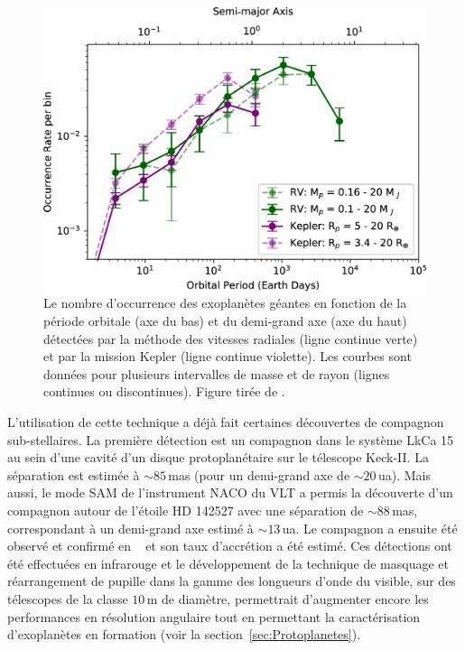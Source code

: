 \begin{figure}[ht!]
    \centering
    \includegraphics[width=\figwidth]{Figure_Chap1/Fernandes2019_Figure02.jpg}
    \caption[Le nombre d'occurrence des exoplanètes détectées par la méthode des vitesses radiales et par la mission Kepler en fonction de la période orbitale et du demi-grand axe.]{Le nombre d'occurrence des exoplanètes géantes en fonction de la période orbitale (axe du bas) et du demi-grand axe (axe du haut) détectées par la méthode des vitesses radiales (ligne continue verte) et par la mission Kepler (ligne continue violette). Les courbes sont données pour plusieurs intervalles de masse et de rayon (lignes continues ou discontinues). Figure tirée de \cite{fernandes2019}.}
    \label{fig:Fernandes2019F2}
\end{figure}

L'utilisation de cette technique a déjà fait certaines découvertes de compagnon sub-stellaires. La première détection est un compagnon dans le système LkCa 15 au sein d'une cavité d'un disque protoplanétaire \citep{kraus2012} sur le télescope Keck-II. La séparation est estimée à $\sim 85 \,$mas (pour un demi-grand axe de $\sim 20 \,$ua). Mais aussi, le mode \ac{SAM} de l'instrument \ac{NACO} du \ac{VLT} a permis la découverte d'un compagnon autour de l'étoile HD 142527 \citep{biller2012} avec une séparation de $\sim 88 \,$mas, correspondant à un demi-grand axe estimé à $\sim 13 \,$ua. Le compagnon a ensuite été observé et confirmé en \ha~\citep{close2014} et son taux d'accrétion a été estimé. Ces détections ont été effectuées en infrarouge et le développement de la technique de masquage et réarrangement de pupille dans la gamme des longueurs d'onde du visible, sur des télescopes de la classe $10 \,$m de diamètre, permettrait d'augmenter encore les performances en résolution angulaire tout en permettant la caractérisation d'exoplanètes en formation (voir la section~\ref{sec:Protoplanetes}).


